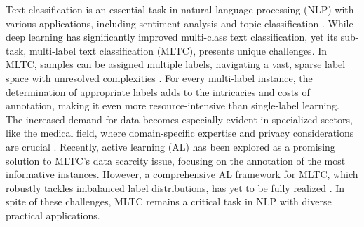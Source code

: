 \documentclass[letterpaper]{article} %
\begin{document}
Text classification is an essential task in natural language processing (NLP) with various applications, including sentiment analysis and topic classification \cite{8719904, 9412588}.
While deep learning has significantly improved multi-class text classification, yet its sub-task, multi-label text classification (MLTC), presents unique challenges.
In MLTC, samples can be assigned multiple labels, navigating a vast, sparse label space with unresolved complexities \citep{10.1145/3077136.3080834, 8830456}.
For every multi-label instance, the determination of appropriate labels adds to the intricacies and costs of annotation, making it even more resource-intensive than single-label learning.
The increased demand for data becomes especially evident in specialized sectors, like the medical field, where domain-specific expertise and privacy considerations are crucial \citep{BUSTOS2020101797}.
Recently, active learning (AL) has been explored as a promising solution to MLTC's data scarcity issue, focusing on the annotation of the most informative instances.
However, a comprehensive AL framework for MLTC, which robustly tackles imbalanced label distributions, has yet to be fully realized \citep{Cherman2019, 10.1145/3379504}.
In spite of these challenges, MLTC remains a critical task in NLP with diverse practical applications.
\end{document}
